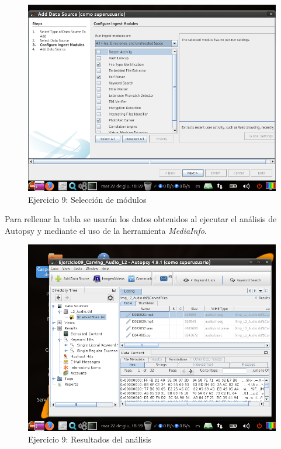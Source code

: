 \documentclass[11pt]{article}
\begin{document}
\begin{figure}[H]
    \caption{Ejercicio 9: Selección de módulos}
    \centering
    \includegraphics[scale=0.7]{e9-4.png}
\end{figure}

Para rellenar la tabla se usarán los datos obtenidos al ejecutar el análisis de Autopsy y mediante el uso de la herramienta \textit{MediaInfo}.

\begin{figure}[H]
    \caption{Ejercicio 9: Resultados del análisis}
    \centering
    \includegraphics[scale=0.7]{e9-5.png}
\end{figure}
\end{document}

